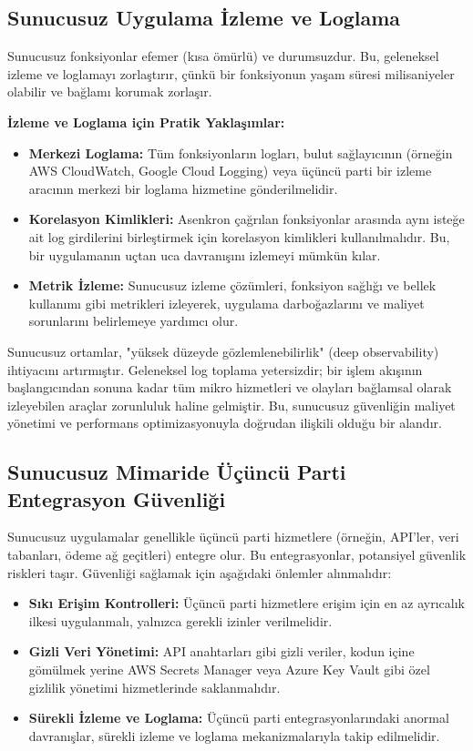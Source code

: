 \subsection{Sunucusuz Uygulama İzleme ve Loglama}
Sunucusuz fonksiyonlar efemer (kısa ömürlü) ve durumsuzdur. Bu, geleneksel izleme ve loglamayı zorlaştırır, çünkü bir fonksiyonun yaşam süresi milisaniyeler olabilir ve bağlamı korumak zorlaşır.

\textbf{İzleme ve Loglama için Pratik Yaklaşımlar:}
\begin{itemize}
    \item \textbf{Merkezi Loglama:} Tüm fonksiyonların logları, bulut sağlayıcının (örneğin AWS CloudWatch, Google Cloud Logging) veya üçüncü parti bir izleme aracının merkezi bir loglama hizmetine gönderilmelidir.
    \item \textbf{Korelasyon Kimlikleri:} Asenkron çağrılan fonksiyonlar arasında aynı isteğe ait log girdilerini birleştirmek için korelasyon kimlikleri kullanılmalıdır. Bu, bir uygulamanın uçtan uca davranışını izlemeyi mümkün kılar.
    \item \textbf{Metrik İzleme:} Sunucusuz izleme çözümleri, fonksiyon sağlığı ve bellek kullanımı gibi metrikleri izleyerek, uygulama darboğazlarını ve maliyet sorunlarını belirlemeye yardımcı olur.
\end{itemize}
Sunucusuz ortamlar, "yüksek düzeyde gözlemlenebilirlik" (deep observability) ihtiyacını artırmıştır. Geleneksel log toplama yetersizdir; bir işlem akışının başlangıcından sonuna kadar tüm mikro hizmetleri ve olayları bağlamsal olarak izleyebilen araçlar zorunluluk haline gelmiştir. Bu, sunucusuz güvenliğin maliyet yönetimi ve performans optimizasyonuyla doğrudan ilişkili olduğu bir alandır.

\subsection{Sunucusuz Mimaride Üçüncü Parti Entegrasyon Güvenliği}
Sunucusuz uygulamalar genellikle üçüncü parti hizmetlere (örneğin, API'ler, veri tabanları, ödeme ağ geçitleri) entegre olur. Bu entegrasyonlar, potansiyel güvenlik riskleri taşır. Güvenliği sağlamak için aşağıdaki önlemler alınmalıdır:
\begin{itemize}
    \item \textbf{Sıkı Erişim Kontrolleri:} Üçüncü parti hizmetlere erişim için en az ayrıcalık ilkesi uygulanmalı, yalnızca gerekli izinler verilmelidir.
    \item \textbf{Gizli Veri Yönetimi:} API anahtarları gibi gizli veriler, kodun içine gömülmek yerine AWS Secrets Manager veya Azure Key Vault gibi özel gizlilik yönetimi hizmetlerinde saklanmalıdır.
    \item \textbf{Sürekli İzleme ve Loglama:} Üçüncü parti entegrasyonlarındaki anormal davranışlar, sürekli izleme ve loglama mekanizmalarıyla takip edilmelidir.
\end{itemize}

